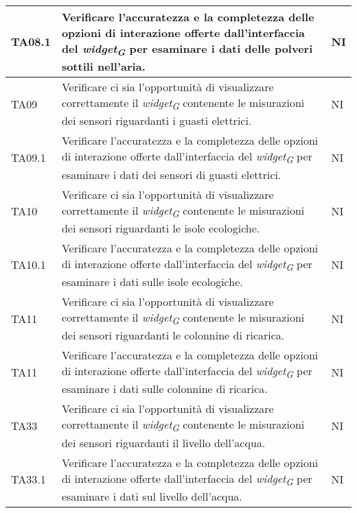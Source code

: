 \begin{longtable}{|C{1.9cm}|L{5cm}|C{2cm}|}
    TA08.1 & Verificare l'accuratezza e la completezza delle opzioni di interazione offerte dall'interfaccia del \textit{widget}\textsubscript{\textit{G}} per esaminare i dati delle polveri sottili nell'aria. & NI \\
    \hline
    
    TA09 & Verificare ci sia l'opportunità di visualizzare correttamente il \textit{widget}\textsubscript{\textit{G}} contenente le misurazioni dei sensori riguardanti i guasti elettrici. & NI \\
    \hline
    
    TA09.1 & Verificare l'accuratezza e la completezza delle opzioni di interazione offerte dall'interfaccia del \textit{widget}\textsubscript{\textit{G}} per esaminare i dati dei sensori di guasti elettrici. & NI \\
    \hline
    
    TA10 & Verificare ci sia l'opportunità di visualizzare correttamente il \textit{widget}\textsubscript{\textit{G}} contenente le misurazioni dei sensori riguardanti le isole ecologiche. & NI \\
    \hline
    
    TA10.1 & Verificare l'accuratezza e la completezza delle opzioni di interazione offerte dall'interfaccia del \textit{widget}\textsubscript{\textit{G}} per esaminare i dati sulle isole ecologiche. & NI \\
    \hline
    
    TA11 & Verificare ci sia l'opportunità di visualizzare correttamente il \textit{widget}\textsubscript{\textit{G}} contenente le misurazioni dei sensori riguardanti le colonnine di ricarica. & NI \\
    \hline
    
    TA11 & Verificare l'accuratezza e la completezza delle opzioni di interazione offerte dall'interfaccia del \textit{widget}\textsubscript{\textit{G}} per esaminare i dati sulle colonnine di ricarica. & NI \\
    \hline
    
    TA33 & Verificare ci sia l'opportunità di visualizzare correttamente il \textit{widget}\textsubscript{\textit{G}} contenente le misurazioni dei sensori riguardanti il livello dell'acqua. & NI \\
    \hline
    
    TA33.1 & Verificare l'accuratezza e la completezza delle opzioni di interazione offerte dall'interfaccia del \textit{widget}\textsubscript{\textit{G}} per esaminare i dati sul livello dell'acqua. & NI \\
    \hline
    

\end{longtable}
